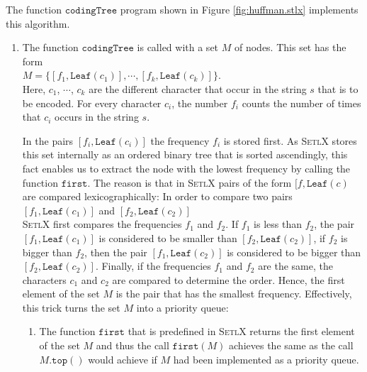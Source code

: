 \noindent
The function $\texttt{codingTree}$ program shown in Figure \ref{fig:huffman.stlx} implements this algorithm.
\begin{enumerate}
\item The function $\texttt{codingTree}$ is called with a set  $M$ of nodes.  This set has the form
      \\[0.2cm]
      \hspace*{1.3cm}
      $M = \bigl\{ [ f_1, \texttt{Leaf}(c_1) ], \cdots, [f_k, \texttt{Leaf}(c_k)] \bigr\}$.
      \\[0.2cm]
      Here, $c_1$, $\cdots$, $c_k$ are the different character that occur in the string $s$ that is to be encoded. 
      For every character $c_i$, the number $f_i$ counts the number of times that $c_i$ occurs in the string $s$.

      In the pairs $[f_i, \texttt{Leaf}(c_i)]$ the frequency $f_i$ is stored first.
      As \textsc{SetlX} stores this set internally as an ordered binary tree that is sorted ascendingly, this
      fact enables us to extract the node with the lowest frequency by calling the function $\texttt{first}$.
      The reason is that in \textsc{SetlX} pairs of the form $[f, \texttt{Leaf}(c)$ are compared
      lexicographically:  In order to compare two pairs
      \\[0.2cm]
      \hspace*{1.3cm}
      $[f_1, \texttt{Leaf}(c_1)]$ \quad and \quad $[f_2, \texttt{Leaf}(c_2)]$
      \\[0.2cm]
      \textsc{SetlX} first compares the frequencies $f_1$ and $f_2$.  If $f_1$ is less than $f_2$, the pair
      $[f_1, \texttt{Leaf}(c_1)]$ is considered to be smaller than $[f_2, \texttt{Leaf}(c_2)]$, if $f_2$ is bigger
      than $f_2$, then the pair $[f_1, \texttt{Leaf}(c_2)]$ is considered to be bigger than
      $[f_2,
      \texttt{Leaf}(c_2)]$.  Finally, if the frequencies $f_1$ and $f_2$ are the same, the characters $c_1$ and
      $c_2$ are compared to determine the order.  Hence, the first element of the set $M$ is the pair that has
      the smallest frequency.  Effectively, this trick turns the set $M$ into a priority queue:
      \begin{enumerate}
      \item The function $\texttt{first}$ that is predefined in \textsc{SetlX} returns the first element of the
            set $M$ and thus the call $\texttt{first}(M)$ achieves the same as the call $M.\texttt{top}()$
            would achieve if $M$ had been implemented as a priority queue.

\end{enumerate}
\end{enumerate}
